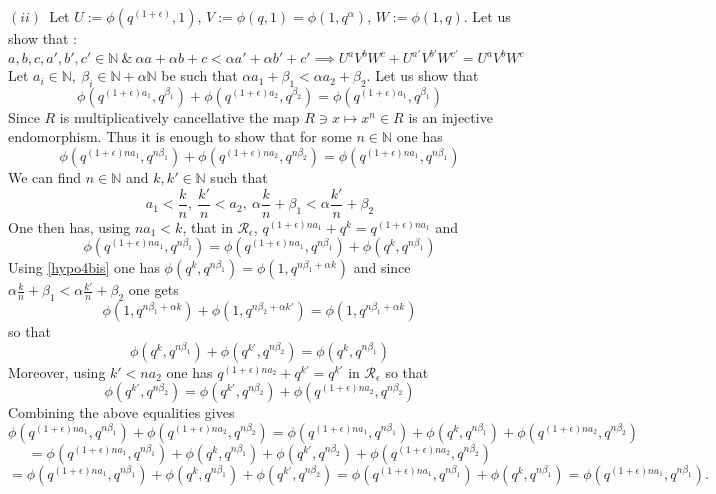 \documentclass[noams,lp]{compositio}
\def\N{{\mathbb N}}
\def\cR{{\mathcal R}}
\def\mc{multiplicatively cancellative }
\def\beps{{\cR_\epsilon}}
\begin{document}
 $(ii)$~Let $U:=\phi(q^{(1+\epsilon)},1)$, $V:=\phi(q,1)=\phi(1,q^{\alpha})$,  $W:=\phi(1,q)$. Let us show that  :
$$
a,b,c,a',b',c'\in \N\ \&\ \alpha a+\alpha b+c<\alpha a'+\alpha b'+c' \implies U^aV^bW^c+U^{a'}V^{b'}W^{c'}=U^aV^bW^c
$$
Let $a_i\in \N, \   \beta_i\in \N+\alpha \N$ be such that $\alpha a_1+\beta_1<\alpha a_2+\beta_2$. Let us show that 
\begin{equation}\label{simprule2bis}
\phi(q^{(1+\epsilon)a_1}, q^{\beta_1})+\phi(q^{(1+\epsilon)a_2}, q^{\beta_2})=\phi(q^{(1+\epsilon)a_1}, q^{\beta_1})
\end{equation}
Since $R$ is \mc the map $R\ni x\mapsto x^n\in R$ is an injective endomorphism. Thus it is enough to show that for some $n\in \N$ one has 
\begin{equation}\label{simprule4bis}
\phi(q^{(1+\epsilon)n a_1}, q^{n\beta_1})+\phi(q^{(1+\epsilon)n a_2}, q^{n\beta_2})=\phi(q^{(1+\epsilon)n a_1}, q^{n\beta_1})
\end{equation}
We can find $n\in\N$  and $k,k'\in \N$ such that 
$$
a_1 < \frac kn, \  \frac{ k'}{n}< a_2, \ \alpha\frac kn+\beta_1< \alpha\frac{ k'}{n}+\beta_2
$$
One then has, using $n a_1< k$, that in $\beps$, $q^{(1+\epsilon)n a_1}+ q^k=q^{(1+\epsilon)n a_1}$ and 
$$
\phi(q^{(1+\epsilon)n a_1}, q^{n\beta_1})=\phi(q^{(1+\epsilon)n a_1}, q^{n\beta_1})+\phi(q^{k}, q^{n\beta_1})
$$
Using \eqref{hypo4bis}
 one has  $\phi(q^{k}, q^{n\beta_1})=\phi(1,q^{n\beta_1+\alpha k})$ and since $\alpha\frac kn+\beta_1< \alpha\frac{ k'}{n}+\beta_2$ one gets
$$
\phi(1,q^{n\beta_1+\alpha k})+\phi(1,q^{n\beta_2+\alpha k'})=\phi(1,q^{n\beta_1+\alpha k})
$$
so that 
$$
\phi(q^{k}, q^{n\beta_1})+\phi(q^{k'}, q^{n\beta_2})=\phi(q^{k}, q^{n\beta_1})
$$
Moreover, using $k'< n a_2$ one has $q^{(1+\epsilon)n a_2}+ q^{k'}=q^{k'}$ in $\beps$ so that
$$
\phi(q^{k'}, q^{n\beta_2})=\phi(q^{k'}, q^{n\beta_2})+\phi(q^{(1+\epsilon)n a_2}, q^{n\beta_2})
$$
Combining the above equalities gives
$$
\phi(q^{(1+\epsilon)n a_1}, q^{n\beta_1})+\phi(q^{(1+\epsilon)n a_2}, q^{n\beta_2})=\phi(q^{(1+\epsilon)n a_1}, q^{n\beta_1})+\phi(q^{k}, q^{n\beta_1})+\phi(q^{(1+\epsilon)n a_2}, q^{n\beta_2})
$$
$$
=\phi(q^{(1+\epsilon)n a_1}, q^{n\beta_1})+\phi(q^{k}, q^{n\beta_1})+\phi(q^{k'}, q^{n\beta_2})+\phi(q^{(1+\epsilon)n a_2}, q^{n\beta_2})$$ $$
=\phi(q^{(1+\epsilon)n a_1}, q^{n\beta_1})+\phi(q^{k}, q^{n\beta_1})+\phi(q^{k'}, q^{n\beta_2})
=\phi(q^{(1+\epsilon)n a_1}, q^{n\beta_1})+\phi(q^{k}, q^{n\beta_1})=\phi(q^{(1+\epsilon)n a_1}, q^{n\beta_1}).
$$
\end{document}
